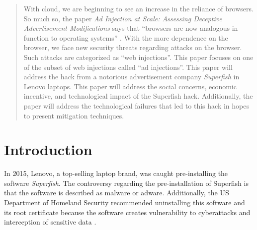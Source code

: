 \documentclass[journal]{IEEEtran}
\begin{document}




\maketitle


\begin{abstract}
With cloud, we are beginning to see an increase in the reliance of browsers. So much so, the paper \textit{Ad Injection at Scale: Assessing Deceptive Advertisement Modifications} says that ``browsers are now analogous in function to operating systems'' \cite{ad_inject}. With the more dependence on the browser, we face new security threats regarding attacks on the browser. Such attacks are categorized as ``web injections''. This paper focuses on one of the subset of web injections called ``ad injections''. This paper will address the hack from a notorious advertisement company \textit{Superfish} in Lenovo laptops. This paper will address the social concerns, economic incentive, and technological impact of the Superfish hack. Additionally, the paper will address the technological failures that led to this hack in hopes to present mitigation techniques.


\end{abstract}







%
\IEEEpeerreviewmaketitle



\section{Introduction}
In 2015, Lenovo, a top-selling laptop brand, was caught pre-installing the software \textit{Superfish}. The controversy regarding the pre-installation of Superfish is that the software is described as malware or adware. Additionally, the US Department of Homeland Security recommended uninstalling this software and its root certificate because the software creates vulnerability to cyberattacks and interception of sensitive data \cite{superfish_wiki}.  
\end{document}

